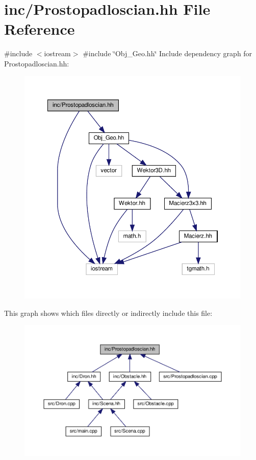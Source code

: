 \hypertarget{_prostopadloscian_8hh}{}\section{inc/\+Prostopadloscian.hh File Reference}
\label{_prostopadloscian_8hh}
{\ttfamily \#include $<$iostream$>$}\newline
{\ttfamily \#include \char`\"{}Obj\+\_\+\+Geo.\+hh\char`\"{}}\newline
Include dependency graph for Prostopadloscian.\+hh\+:
\nopagebreak
\begin{figure}[H]
\begin{center}
\leavevmode
\includegraphics[width=350pt]{_prostopadloscian_8hh__incl}
\end{center}
\end{figure}
This graph shows which files directly or indirectly include this file\+:
\nopagebreak
\begin{figure}[H]
\begin{center}
\leavevmode
\includegraphics[width=350pt]{_prostopadloscian_8hh__dep__incl}
\end{center}
\end{figure}
